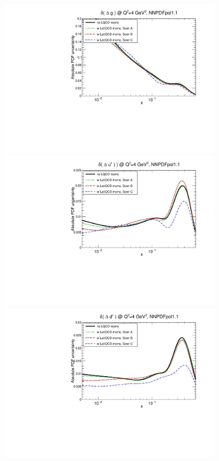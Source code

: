\begin{figure}[!t]
\centering
\includegraphics[scale=0.45]{plots/xg-pol-lattice-relerr.pdf}
\includegraphics[scale=0.45]{plots/xup-pol-lattice-relerr.pdf}
\includegraphics[scale=0.45]{plots/xdp-pol-lattice-relerr.pdf}

\end{figure}
